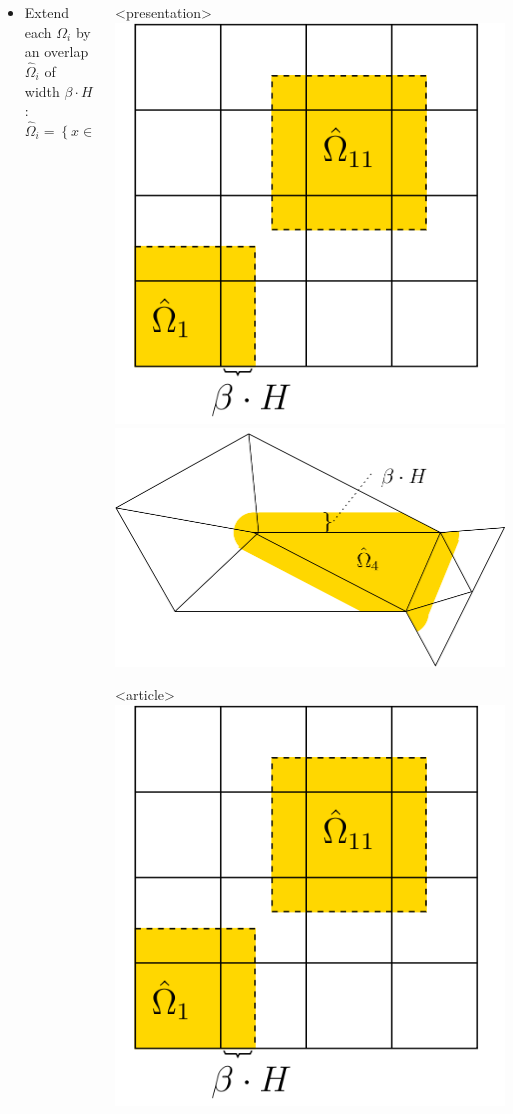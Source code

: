 \documentclass[aspectratio=169,11pt]{beamer}
\theoremstyle{definition}
\begin{document}
\begin{frame}
\begin{columns}
\begin{column}{0.6\linewidth}
      \begin{itemize}
      \item Extend each $\Omega_i$ by an overlap $\hat \Omega_i$ of width
        $\beta\cdot H$:
        \[
        \hat \Omega_i = \left\{ x\in\Omega \mid \mathsf{dist}(x,\Omega_i) < \beta\cdot H \right\}
        \]
      \end{itemize}
    \end{column}
    \begin{column}{0.4\linewidth}
      \begin{onlyenv}<presentation>
        \includegraphics[width=0.6\linewidth]{konstr_uberl_str}
        \vskip5mm
        \includegraphics[width=0.9\linewidth]{konstr_uberl_unstr}
      \end{onlyenv}
      \begin{onlyenv}<article>
        \includegraphics[width=.25\linewidth]{konstr_uberl_str}

\end{onlyenv}
\end{column}
\end{columns}
\end{frame}
\end{document}
